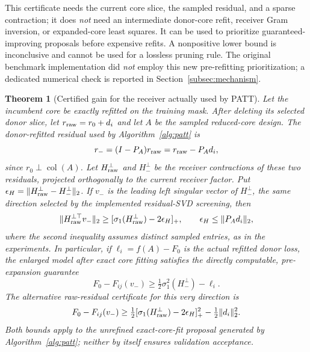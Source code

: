 \documentclass[review,10pt]{elsarticle}
\newtheorem{theorem}{Theorem}
\begin{document}
This certificate needs the current core slice, the sampled residual, and a sparse contraction; it does \emph{not} need an intermediate donor-core refit, receiver Gram inversion, or expanded-core least squares. It can be used to prioritize guaranteed-improving proposals before expensive refits. A nonpositive lower bound is inconclusive and cannot be used for a lossless pruning rule. The original benchmark implementation did \emph{not} employ this new pre-refitting prioritization; a dedicated numerical check is reported in Section~\ref{subsec:mechanism}.


\begin{theorem}[Certified gain for the receiver actually used by PATT]\label{thm:actualreceiver}
Let the incumbent core be exactly refitted on the training mask. After deleting its selected donor slice, let $r_{\rm raw}=r_0+d_i$ and let $A$ be the sampled reduced-core design. The donor-refitted residual used by Algorithm~\ref{alg:patt} is
\begin{equation}\label{eq:rawrefit}
r_-= (I-P_A)r_{\rm raw}=r_{\rm raw}-P_A d_i,
\end{equation}
since $r_0\perp\operatorname{col}(A)$. Let $H_{\rm raw}^{\perp}$ and $H_-^{\perp}$ be the receiver contractions of these two residuals, projected orthogonally to the current receiver factor. Put
$\epsilon_H=\|H_{\rm raw}^{\perp}-H_-^{\perp}\|_2$. If $v_-$ is the leading left singular vector of $H_-^{\perp}$, the \emph{same direction selected by the implemented residual-SVD screening}, then
\begin{equation}\label{eq:bridge}
\|H_{\rm raw}^{\perp\top}v_-\|_2
\ge [\sigma_1(H_{\rm raw}^{\perp})-2\epsilon_H]_+,
\qquad \epsilon_H\le\|P_A d_i\|_2,
\end{equation}
where the second inequality assumes distinct sampled entries, as in the experiments. In particular, if $\ell_i=f(A)-F_0$ is the \emph{actual refitted donor loss}, the enlarged model after exact core fitting satisfies the directly computable, \emph{pre-expansion} guarantee
\begin{equation}\label{eq:postdonorcert}
\boxed{F_0-F_{ij}(v_-)\ge\tfrac12\sigma_1^2(H_-^{\perp})-\ell_i.}
\end{equation}
The alternative raw-residual certificate for this very direction is
\begin{equation}\label{eq:bridgecert}
F_0-F_{ij}(v_-)\ge\tfrac12[\sigma_1(H_{\rm raw}^{\perp})-2\epsilon_H]_+^2-\tfrac12\|d_i\|_2^2.
\end{equation}
Both bounds apply to the \emph{unrefined} exact-core-fit proposal generated by Algorithm~\ref{alg:patt}; neither by itself ensures validation acceptance.
\end{theorem}
\end{document}
